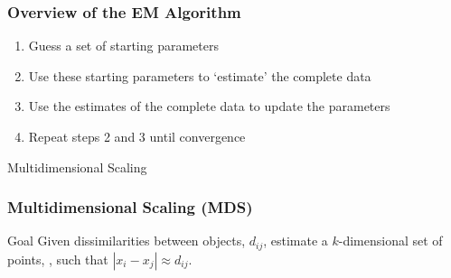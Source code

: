 \documentclass{beamer}
\begin{document}
\begin{frame}
  \frametitle{Overview of the EM Algorithm}

\begin{enumerate}
    \item Guess a set of starting parameters
    \item Use these starting parameters to `estimate' the complete data
    \item Use the estimates of the complete data to update the parameters
    \item Repeat steps 2 and 3 until convergence
\end{enumerate}

\end{frame}



{

}

\begin{frame}[plain,c]
\begin{center}
\Huge Multidimensional Scaling
\end{center}
\end{frame}



\begin{frame}
  \frametitle{Multidimensional Scaling (MDS)}

\begin{block}{Goal}
Given dissimilarities between objects, $d_{ij}$, estimate a $k$-dimensional set of points, , such that $|x_i - x_j| \approx d_{ij}$.
\end{block}


\end{frame}
\end{document}
